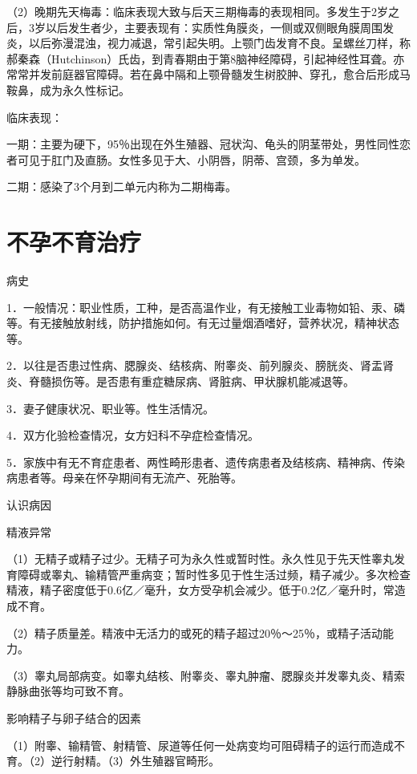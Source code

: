 \documentclass[12pt,UTF8,openany]{ctexbook}
\begin{document}
（2）晚期先天梅毒：临床表现大致与后天三期梅毒的表现相同。多发生于2岁之后，3岁以后发生者少，主要表现有：实质性角膜炎，一侧或双侧眼角膜周围发炎，以后弥漫混浊，视力减退，常引起失明。上颚门齿发育不良。呈螺丝刀样，称郝秦森（Hutchinson）氏齿，到青春期由于第8脑神经障碍，引起神经性耳聋。亦常常并发前庭器官障碍。若在鼻中隔和上颚骨髓发生树胶肿、穿孔，愈合后形成马鞍鼻，成为永久性标记。

临床表现：

一期：主要为硬下，95％出现在外生殖器、冠状沟、龟头的阴茎带处，男性同性恋者可见于肛门及直肠。女性多见于大、小阴唇，阴蒂、宫颈，多为单发。

二期：感染了3个月到二单元内称为二期梅毒。





\chapter{不孕不育治疗}


病史


1．一般情况：职业性质，工种，是否高温作业，有无接触工业毒物如铅、汞、磷等。有无接触放射线，防护措施如何。有无过量烟酒嗜好，营养状况，精神状态等。

2．以往是否患过性病、腮腺炎、结核病、附睾炎、前列腺炎、膀胱炎、肾盂肾炎、脊髓损伤等。是否患有重症糖尿病、肾脏病、甲状腺机能减退等。

3．妻子健康状况、职业等。性生活情况。

4．双方化验检查情况，女方妇科不孕症检查情况。

5．家族中有无不育症患者、两性畸形患者、遗传病患者及结核病、精神病、传染病患者等。母亲在怀孕期间有无流产、死胎等。





认识病因


精液异常

（1）无精子或精子过少。无精子可为永久性或暂时性。永久性见于先天性睾丸发育障碍或睾丸、输精管严重病变；暂时性多见于性生活过频，精子减少。多次检查精液，精子密度低于0.6亿／毫升，女方受孕机会减少。低于0.2亿／毫升时，常造成不育。

（2）精子质量差。精液中无活力的或死的精子超过20％～25％，或精子活动能力。

（3）睾丸局部病变。如睾丸结核、附睾炎、睾丸肿瘤、腮腺炎并发睾丸炎、精索静脉曲张等均可致不育。

影响精子与卵子结合的因素

（1）附睾、输精管、射精管、尿道等任何一处病变均可阻碍精子的运行而造成不育。（2）逆行射精。（3）外生殖器官畸形。
\end{document}
